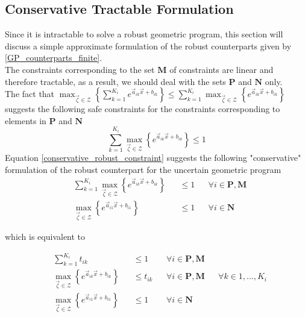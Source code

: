\subsection{Conservative Tractable Formulation} \label{Conservative}
Since it is intractable to solve a robust geometric program,
this section will discuss a simple approximate formulation of the robust counterparts given by \eqref{GP_counterparts_finite}.\\[12pt]
The constraints corresponding to the set $\mathbf{M}$ of constraints are linear and therefore tractable, as a result, we should deal with the sets $\mathbf{P}$ and $\mathbf{N}$ only.\\[12pt]
The fact that $\max_{\vec{\zeta} \in \mathcal{Z}} \left\{\textstyle{\sum}_{k=1}^{K_i}e^{\vec{a}_{ik}\vec{x} + b_{ik}}\right\} \leq \sum_{k=1}^{K_i}\max_{\vec{\zeta} \in \mathcal{Z}} \left\{e^{\vec{a}_{ik}\vec{x} + b_{ik}}\right\}$ suggests the following safe constraints for the constraints corresponding to elements in $\mathbf{P}$ and $\mathbf{N}$
\begin{equation}
\sum_{k=1}^{K_i}\max_{\vec{\zeta} \in \mathcal{Z}} \left\{e^{\vec{a}_{ik}\vec{x} + b_{ik}}\right\} \leq 1
\label{conservative_robust_constraint}
\end{equation}
Equation \eqref{conservative_robust_constraint} suggests the following "conservative" formulation of the robust counterpart for the uncertain geometric program
\begin{equation}
\begin{aligned}
&\textstyle{\sum}_{k=1}^{K_i}\max_{\vec{\zeta} \in \mathcal{Z}} \left\{e^{\vec{a}_{ik}\vec{x} + b_{ik}}\right\} &&\leq 1 &&\forall i \in \mathbf{P},\mathbf{M}\\
&\max_{\vec{\zeta} \in \mathcal{Z}} \left\{e^{\vec{a}_{i1}\vec{x} + b_{i1}}\right\} &&\leq 1 &&\forall i \in \mathbf{N}
\end{aligned}
\label{GP_safe_conservative}
\end{equation}

which is equivalent to

\begin{equation}
\begin{aligned}
&\textstyle{\sum}_{k=1}^{K_i}t_{ik} &&\leq 1 &&\forall i \in \mathbf{P},\mathbf{M} \\
&\max_{\vec{\zeta} \in \mathcal{Z}} \left\{e^{\vec{a}_{ik}\vec{x} + b_{ik}}\right\} &&\leq t_{ik} &&\forall i \in \mathbf{P},\mathbf{M} &&\forall k \in 1,...,K_i\\
&\max_{\vec{\zeta} \in \mathcal{Z}} \left\{e^{\vec{a}_{i1}\vec{x} + b_{i1}}\right\} &&\leq 1 &&\forall i \in \mathbf{N}
\end{aligned}
\label{GP_safe_decoupled}
\end{equation}


